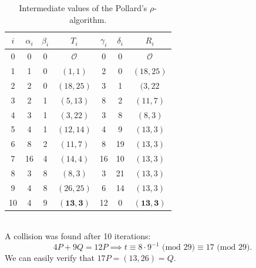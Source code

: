 \documentclass[thesis=M,english]{FITthesis}[2012/10/20]
\theoremstyle{remark}
\theoremstyle{definition}
\begin{document}
\begin{table}[!h]
\centering
\begin{tabular}{ |c||c|c|c|c|c|c| } 
\hline
$i$ & $\alpha_i$ & $\beta_i$ & $T_i$ & $\gamma_i$ & $\delta_i$ & $R_i$ \\ 
\hline
\hline
0 & 0 & 0 & $\mathcal{O}$ &  0 & 0 & $\mathcal{O}$ \\ \hline
1 & 1 & 0 & $(1,1)$ &  2 & 0 & $(18,25)$ \\ \hline
2 & 2 & 0 & $(18,25)$ &  3 & 1 & $(3,22$ \\ \hline
3 & 2 & 1 & $(5,13)$ &  8 & 2 & $(11,7)$ \\ \hline
4 & 3 & 1 & $(3,22)$ &  3 & 8 & $(8,3)$ \\ \hline
5 & 4 & 1 & $(12,14)$ &  4 & 9 & $(13,3)$ \\ \hline
6 & 8 & 2 & $(11,7)$ &  8 & 19 & $(13,3)$ \\ \hline
7 & 16 & 4 & $(14,4)$ &  16 & 10 & $(13,3)$ \\ \hline
8 & 3 & 8 & $(8,3)$ &  3 & 21 & $(13,3)$ \\ \hline
9 & 4 & 8 & $(26,25)$ &  6 & 14 & $(13,3)$ \\ \hline
10 & 4 & 9 & $\mathbf{(13,3)}$ &  12 & 0 & $\mathbf{(13,3)}$ \\ \hline
\end{tabular}
\caption[Intermediate values of the Pollard's $\rho$-algorithm]{Intermediate values of the Pollard's $\rho$-algorithm.}
\label{tblRho}
\end{table}
\\
\noindent A collision was found after 10 iterations: 
$$
4P + 9Q = 12P \implies t \equiv 8\cdot9^{-1} \text{ (mod $29$)} \equiv 17 \text{ (mod $29$)}. 
$$
We can easily verify that $17P = (13,26) = Q.$
\end{document}
